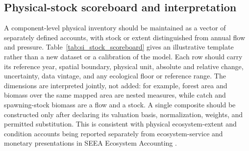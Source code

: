 \documentclass[11pt,a4paper]{article}
\begin{document}
\subsection{Physical-stock scoreboard and interpretation}\label{si:stocks}

A component-level physical inventory should be maintained as a vector of separately defined accounts, with stock or extent distinguished from annual flow and pressure. Table~\ref{tab:si_stock_scoreboard} gives an illustrative template rather than a new dataset or a calibration of the model. Each row should carry its reference year, spatial boundary, physical unit, absolute and relative change, uncertainty, data vintage, and any ecological floor or reference range. The dimensions are interpreted jointly, not added: for example, forest area and biomass over the same mapped area are nested measures, while catch and spawning-stock biomass are a flow and a stock. A single composite should be constructed only after declaring its valuation basis, normalization, weights, and permitted substitution. This is consistent with physical ecosystem-extent and condition accounts being reported separately from ecosystem-service and monetary presentations in SEEA Ecosystem Accounting \citep{UN2021SEEA_EA}.
\end{document}

